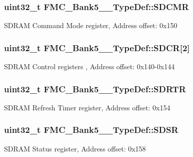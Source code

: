 \subsubsection[{\texorpdfstring{S\+D\+C\+MR}{SDCMR}}]{ uint32\+\_\+t F\+M\+C\+\_\+\+Bank5\+\_\+\_\+\+Type\+Def\+::\+S\+D\+C\+MR}\hypertarget{struct_f_m_c___bank5__6___type_def_ad328f49a71561cd3f159af6faf65a641}{}\label{struct_f_m_c___bank5__6___type_def_ad328f49a71561cd3f159af6faf65a641}
S\+D\+R\+AM Command Mode register, Address offset\+: 0x150 
\subsubsection[{\texorpdfstring{S\+D\+CR}{SDCR}}]{ uint32\+\_\+t F\+M\+C\+\_\+\+Bank5\+\_\+\_\+\+Type\+Def\+::\+S\+D\+CR\mbox{[}2\mbox{]}}\hypertarget{struct_f_m_c___bank5__6___type_def_a252c4ada37ac883b8e4fe0b08c781d0b}{}\label{struct_f_m_c___bank5__6___type_def_a252c4ada37ac883b8e4fe0b08c781d0b}
S\+D\+R\+AM Control registers , Address offset\+: 0x140-\/0x144 
\subsubsection[{\texorpdfstring{S\+D\+R\+TR}{SDRTR}}]{ uint32\+\_\+t F\+M\+C\+\_\+\+Bank5\+\_\+\_\+\+Type\+Def\+::\+S\+D\+R\+TR}\hypertarget{struct_f_m_c___bank5__6___type_def_ac1887d031d16c1bf2c0a51ee9001f886}{}\label{struct_f_m_c___bank5__6___type_def_ac1887d031d16c1bf2c0a51ee9001f886}
S\+D\+R\+AM Refresh Timer register, Address offset\+: 0x154 
\subsubsection[{\texorpdfstring{S\+D\+SR}{SDSR}}]{ uint32\+\_\+t F\+M\+C\+\_\+\+Bank5\+\_\+\_\+\+Type\+Def\+::\+S\+D\+SR}\hypertarget{struct_f_m_c___bank5__6___type_def_a9f268f86cf706c2c78d8a6a9fbe9d9a3}{}\label{struct_f_m_c___bank5__6___type_def_a9f268f86cf706c2c78d8a6a9fbe9d9a3}
S\+D\+R\+AM Status register, Address offset\+: 0x158 
